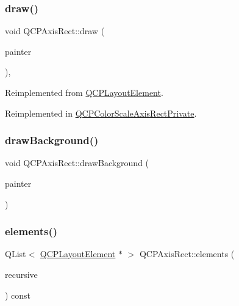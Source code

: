\subsubsection{\texorpdfstring{draw()}{draw()}}
{\footnotesize\ttfamily void Q\+C\+P\+Axis\+Rect\+::draw (\begin{DoxyParamCaption}\item[{\mbox{\hyperlink{class_q_c_p_painter}{Q\+C\+P\+Painter}} $\ast$}]{painter }\end{DoxyParamCaption})\hspace{0.3cm}{\ttfamily [protected]}, {\ttfamily [virtual]}}



Reimplemented from \mbox{\hyperlink{class_q_c_p_layout_element_ad1c597b1d608cfdd86e7b76819a94cfb}{Q\+C\+P\+Layout\+Element}}.



Reimplemented in \mbox{\hyperlink{class_q_c_p_color_scale_axis_rect_private_a52a21c7cbe086cd587c955cfe6e25e3b}{Q\+C\+P\+Color\+Scale\+Axis\+Rect\+Private}}.

\mbox{\label{class_q_c_p_axis_rect_ab49d338d1ce74b476fcead5b32cf06dc}} 
\subsubsection{\texorpdfstring{drawBackground()}{drawBackground()}}
{\footnotesize\ttfamily void Q\+C\+P\+Axis\+Rect\+::draw\+Background (\begin{DoxyParamCaption}\item[{\mbox{\hyperlink{class_q_c_p_painter}{Q\+C\+P\+Painter}} $\ast$}]{painter }\end{DoxyParamCaption})\hspace{0.3cm}{\ttfamily [protected]}}

\mbox{\label{class_q_c_p_axis_rect_a3aee067fd105f2fa8de9eb8024435ac5}} 
\subsubsection{\texorpdfstring{elements()}{elements()}}
{\footnotesize\ttfamily Q\+List$<$ \mbox{\hyperlink{class_q_c_p_layout_element}{Q\+C\+P\+Layout\+Element}} $\ast$ $>$ Q\+C\+P\+Axis\+Rect\+::elements (\begin{DoxyParamCaption}\item[{bool}]{recursive }\end{DoxyParamCaption}) const\hspace{0.3cm}{\ttfamily [virtual]}}

